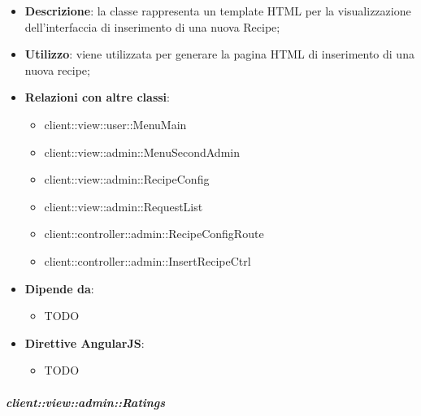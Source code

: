			\begin{itemize}
				\item \textbf{Descrizione}: la classe rappresenta un template HTML per la visualizzazione dell'interfaccia di inserimento di una nuova Recipe;
				\item \textbf{Utilizzo}: viene utilizzata per generare la pagina HTML di inserimento di una nuova recipe;
				\item \textbf{Relazioni con altre classi}:
					\begin{itemize}
						\item client::view::user::MenuMain
						\item client::view::admin::MenuSecondAdmin
						\item client::view::admin::RecipeConfig
						\item client::view::admin::RequestList
						\item client::controller::admin::RecipeConfigRoute
						\item client::controller::admin::InsertRecipeCtrl
					\end{itemize}
				\item \textbf{Dipende da}:
					\begin{itemize}
						\item TODO
					\end{itemize}
				\item \textbf{Direttive AngularJS}:
					\begin{itemize}
						\item TODO
					\end{itemize}
			\end{itemize}

		\subparagraph{client::view::admin::Ratings} %
		\label{subp:bdsm_app_client_view_admin_ratings}

